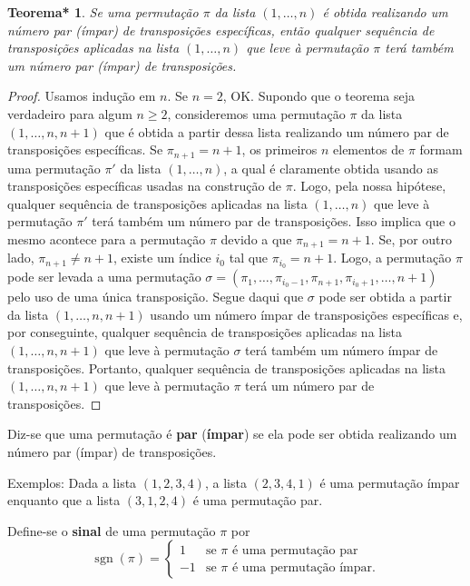 \documentclass[12pt,a4paper]{report}
\newcommand{\tb}{\textbf}
\newtheorem{thm*}[thm]{Teorema*}
\DeclareMathOperator{\sgn}{sgn}
\begin{document}
\begin{thm*}
  Se uma permutação $\pi$ da lista $(1,\ldots,n)$ é obtida realizando um número par (ímpar) de transposições específicas, então qualquer sequência de transposições aplicadas na lista $(1,\ldots,n)$ que leve à permutação $\pi$ terá também um número par (ímpar) de transposições.
\end{thm*}
\begin{proof}
  Usamos indução em $n$. Se $n=2$, OK. Supondo que o teorema seja verdadeiro para algum $n\ge 2$, consideremos uma permutação $\pi$ da lista $(1,\ldots,n,n+1)$ que é obtida a partir dessa lista realizando um número par de transposições específicas. Se $\pi_{n+1}=n+1$, os primeiros $n$ elementos de $\pi$ formam uma permutação $\pi'$ da lista $(1,\ldots,n)$, a qual é claramente obtida usando as transposições específicas usadas na construção de $\pi$. Logo, pela nossa hipótese, qualquer sequência de transposições aplicadas na lista $(1,\ldots,n)$ que leve à permutação $\pi'$ terá também um número par de transposições. Isso implica que o mesmo acontece para a permutação $\pi$ devido a que $\pi_{n+1}=n+1$.
  Se, por outro lado, $\pi_{n+1}\ne n+1$, existe um índice $i_0$ tal que $\pi_{i_0}=n+1$. Logo, a permutação $\pi$ pode ser levada a uma permutação $\sigma=(\pi_1,\ldots,\pi_{i_0-1},\pi_{n+1},\pi_{i_0+1},\ldots,n+1)$ pelo uso de uma única transposição.
  Segue daqui que $\sigma$ pode ser obtida a partir da lista $(1,\ldots,n,n+1)$ usando um número ímpar de transposições específicas e, por conseguinte, qualquer sequência de transposições aplicadas na lista $(1,\ldots,n,n+1)$ que leve à permutação $\sigma$ terá também um número ímpar de transposições. Portanto, qualquer sequência de transposições aplicadas na lista $(1,\ldots,n,n+1)$ que leve à permutação $\pi$ terá um número par de transposições.
\end{proof}


Diz-se que uma permutação é \tb{par} (\tb{ímpar}) se ela pode ser obtida realizando um número par (ímpar) de transposições.

Exemplos: Dada a lista $(1,2,3,4)$, a lista $(2,3,4,1)$ é uma permutação ímpar enquanto que a lista $(3,1,2,4)$ é uma permutação par.

Define-se o \tb{sinal} de uma permutação $\pi$ por
$$\sgn(\pi)=\begin{cases}
  1&\text{se $\pi$ é uma permutação par}\\
  -1&\text{se $\pi$ é uma permutação ímpar.}
\end{cases}$$
\end{document}
